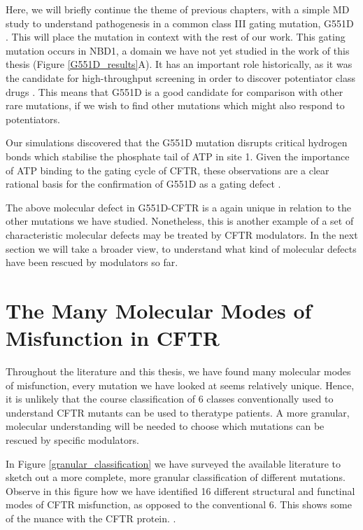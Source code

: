 Here, we will briefly continue the theme of previous chapters, with a simple MD study to understand pathogenesis in a common class III gating mutation, G551D \cite{li1996}. This will place the mutation in context with the rest of our work. This gating mutation occurs in NBD1, a domain we have not yet studied in the work of this thesis (Figure \ref{G551D_results}A). It has an important role historically, as it was the candidate for high-throughput screening in order to discover potentiator class drugs \cite{vangoor2009}. This means that G551D is a good candidate for comparison with other rare mutations, if we wish to find other mutations which might also respond to potentiators.

Our simulations discovered that the G551D mutation disrupts critical hydrogen bonds which stabilise the phosphate tail of ATP in site 1. Given the importance of ATP binding to the gating cycle of CFTR, these observations are a clear rational basis for the confirmation of G551D as a gating defect \cite{}. 

The above molecular defect in G551D-CFTR is a again unique in relation to the other mutations we have studied. Nonetheless, this is another example of a set of characteristic molecular defects may be treated by CFTR modulators. In the next section we will take a broader view, to understand what kind of molecular defects have been rescued by modulators so far.

\section{The Many Molecular Modes of Misfunction in CFTR}

Throughout the literature and this thesis, we have found many molecular modes of misfunction, every mutation we have looked at seems relatively unique. Hence, it is unlikely that the course classification of 6 classes conventionally used to understand CFTR mutants can be used to theratype patients. A more granular, molecular understanding will be needed to choose which mutations can be rescued by specific modulators. 

In Figure \ref{granular_classification} we have surveyed the available literature to sketch out a more complete, more granular classification of different mutations. Observe in this figure how we have identified 16 different structural and functinal modes of CFTR misfunction, as opposed to the conventional 6. This shows some of the nuance with the CFTR protein. .

